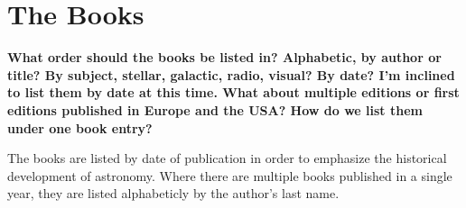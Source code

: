 

\newcommand{\bkentry}[6]{
\stepcounter{bksctr}
\vspace*{1 cm}
\noindent
{\bf\arabic{bksctr}  #2}\newline
{\it\large #3\hfil}\newline
{\bf #1}, #4\newline
#5\newline
#6\newline
Comments:\newline
}

%
%
\newcommand{\exbkentry}[6]{
\vspace*{1 cm}
\noindent
{\bf Index  #2}\newline
{\it\large #3}\newline
{\bf #1}, #4
#5\newline
#6\newline
Comments:\newline
}


\chapter{The Books}

\textbf{What order should the books be listed in? Alphabetic, by author or title? By subject,
stellar, galactic, radio, visual? By date? I'm inclined to list them by date at this time.
What about multiple editions or first editions published in Europe and the USA?  How do
we list them under one book entry?}

The books are listed by date of publication in order to emphasize the historical
development of astronomy.  Where there are multiple books
published in a single year, they are listed alphabeticly by the author's last
name.

